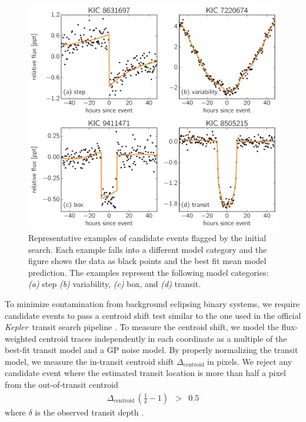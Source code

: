 \documentclass[manuscript, letterpaper]{aastex6}
\makeatletter
\let\origsubsection\subsection
\renewcommand\subsection{\@ifstar{\starsubsection}{\nostarsubsection}}
\newcommand\nostarsubsection[1]{\subsectionprelude\origsubsection{#1}}
\newcommand\starsubsection[1]{\subsectionprelude\origsubsection*{#1}}
\newcommand\subsectionprelude{\vspace{1em}}
\newcommand{\project}[1]{\textsl{#1}}
\newcommand{\kepler}{\project{Kepler}}
\newcommand{\dfmfiglabel}[1]{\label{fig:#1}}
\makeatother
\begin{document}
\begin{figure}[p]~\\
\begin{center}
\includegraphics[width=\textwidth]{figures/model_comp.pdf}
\end{center}
\caption{%
Representative examples of candidate events flagged by the initial search.
Each example falls into a different model category and the figure shows the
data as black points and the best fit mean model prediction.
The examples represent the following model categories:
\emph{(a)} step \emph{(b)} variability, \emph{(c)} box, and \emph{(d)}
transit.
\dfmfiglabel{model-comp}}
\end{figure}


\subsection{Step 3 -- Pixel-level vetting}

To minimize contamination from background eclipsing binary systems, we require
candidate events to pass a centroid shift test similar to the one used in the
official \kepler\ transit search pipeline \citep{Bryson:2013}.
To measure the centroid shift, we model the flux-weighted centroid traces
independently in each coordinate as a multiple of the best-fit transit model
and a GP noise model.
By properly normalizing the transit model, we  measure the in-transit centroid
shift $\Delta_\mathrm{centroid}$ in pixels.
We reject any candidate event where the estimated transit location is more
than half a pixel from the out-of-transit centroid
\begin{eqnarray}
\Delta_\mathrm{centroid}\,\left(\frac{1}{\delta} - 1\right) &>& 0.5
\end{eqnarray}
where $\delta$ is the observed transit depth \citep{Bryson:2013}.
\end{document}
